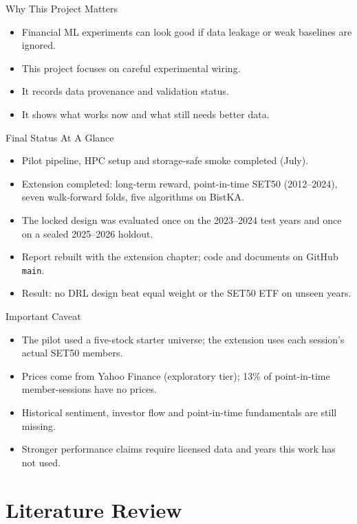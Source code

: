 \documentclass[aspectratio=43,10pt]{beamer}
\begin{document}
\begin{frame}{Why This Project Matters}
\begin{itemize}
  \item Financial ML experiments can look good if data leakage or weak baselines are ignored.
  \item This project focuses on careful experimental wiring.
  \item It records data provenance and validation status.
  \item It shows what works now and what still needs better data.
\end{itemize}
\end{frame}

\begin{frame}{Final Status At A Glance}
\begin{itemize}
  \item Pilot pipeline, HPC setup and storage-safe smoke completed (July).
  \item Extension completed: long-term reward, point-in-time SET50 (2012--2024), seven walk-forward folds, five algorithms on BistKA.
  \item The locked design was evaluated once on the 2023--2024 test years and once on a sealed 2025--2026 holdout.
  \item Report rebuilt with the extension chapter; code and documents on GitHub \texttt{main}.
  \item Result: no DRL design beat equal weight or the SET50 ETF on unseen years.
\end{itemize}
\end{frame}

\begin{frame}{Important Caveat}
\begin{itemize}
  \item The pilot used a five-stock starter universe; the extension uses each session's actual SET50 members.
  \item Prices come from Yahoo Finance (exploratory tier); 13\% of point-in-time member-sessions have no prices.
  \item Historical sentiment, investor flow and point-in-time fundamentals are still missing.
  \item Stronger performance claims require licensed data and years this work has not used.
\end{itemize}
\end{frame}

\section{Literature Review}
\end{document}
